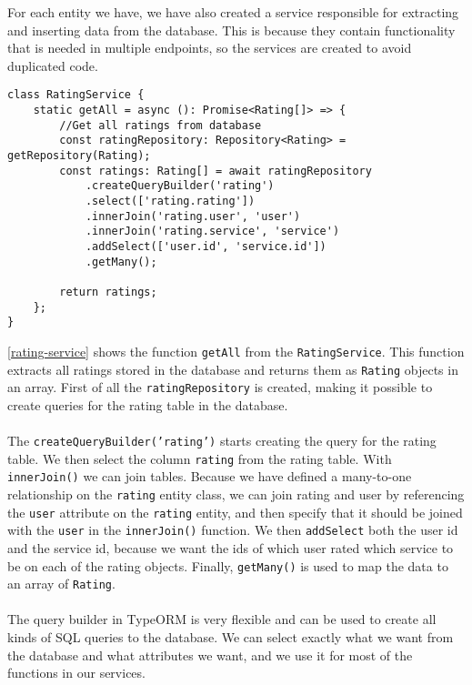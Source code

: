 For each entity we have, we have also created a service responsible for extracting and inserting data from the database.
This is because they contain functionality that is needed in multiple endpoints, so the services are created to avoid duplicated code.
\begin{lstlisting}[caption={Shows the function used to get get all ratings from the rating service}, captionpos=b, label={rating-service}]
class RatingService {
    static getAll = async (): Promise<Rating[]> => {
        //Get all ratings from database
        const ratingRepository: Repository<Rating> = getRepository(Rating);
        const ratings: Rating[] = await ratingRepository
            .createQueryBuilder('rating')
            .select(['rating.rating'])
            .innerJoin('rating.user', 'user')
            .innerJoin('rating.service', 'service')
            .addSelect(['user.id', 'service.id'])
            .getMany();

        return ratings;
    };
}
\end{lstlisting}
\autoref{rating-service} shows the function \texttt{getAll} from the \texttt{RatingService}.
This function extracts all ratings stored in the database and returns them as \texttt{Rating} objects in an array.
First of all the \texttt{ratingRepository} is created, making it possible to create queries for the rating table in the database. 
\\\\
The \texttt{createQueryBuilder('rating')} starts creating the query for the rating table. 
We then select the column \texttt{rating} from the rating table. 
With \texttt{innerJoin()} we can join tables.
Because we have defined a many-to-one relationship on the \texttt{rating} entity class, we can join rating and user by referencing the \texttt{user} attribute on the \texttt{rating} entity, and then specify that it should be joined with the \texttt{user} in the \texttt{innerJoin()} function. 
We then \texttt{addSelect} both the user id and the service id, because we want the ids of which user rated which service to be on each of the rating objects. 
Finally, \texttt{getMany()} is used to map the data to an array of \texttt{Rating}.
\\\\
The query builder in TypeORM is very flexible and can be used to create all kinds of SQL queries to the database. 
We can select exactly what we want from the database and what attributes we want, and we use it for most of the functions in our services.

